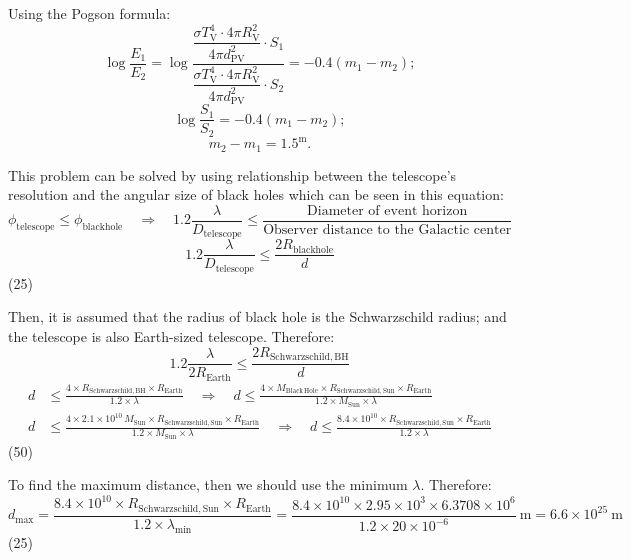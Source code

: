 Using the Pogson formula:
\[
\log\frac{E_1}{E_2}
 = \log\frac{\dfrac{\sigma T_{\mathrm{V}}^4 \cdot 4\pi R_{\mathrm{V}}^2}
                   {4\pi d_{\mathrm{PV}}^2} \cdot S_1}
            {\dfrac{\sigma T_{\mathrm{V}}^4 \cdot 4\pi R_{\mathrm{V}}^2}
                   {4\pi d_{\mathrm{PV}}^2} \cdot S_2}
 = -0.4(m_1 - m_2);
\]
\[
\log\frac{S_1}{S_2} = -0.4(m_1 - m_2);
\]
\[
m_2 - m_1 = 1.5^{\mathrm{m}}.
\]

This problem can be solved by using relationship between the telescope's
resolution and the angular size of black holes which can be seen in this
equation:
\[
\phi_{\mathrm{telescope}} \leq \phi_{\mathrm{blackhole}}
\quad\Rightarrow\quad
1.2\frac{\lambda}{D_{\mathrm{telescope}}}
 \leq \frac{\text{Diameter of event horizon}}
           {\text{Observer distance to the Galactic center}}
\]
\[
1.2\frac{\lambda}{D_{\mathrm{telescope}}}
 \leq \frac{2R_{\mathrm{blackhole}}}{d}
\]
\hfill(25)

Then, it is assumed that the radius of black hole is the Schwarzschild
radius; and the telescope is also Earth-sized telescope. Therefore:
\[
1.2\frac{\lambda}{2R_{\mathrm{Earth}}}
 \leq \frac{2R_{\mathrm{Schwarzschild,BH}}}{d}
\]
\begin{align*}
d &\leq \frac{4 \times R_{\mathrm{Schwarzschild,BH}} \times R_{\mathrm{Earth}}}
             {1.2 \times \lambda}
\quad\Rightarrow\quad
d \leq \frac{4 \times M_{\mathrm{Black\,Hole}}
             \times R_{\mathrm{Schwarzschild,Sun}} \times R_{\mathrm{Earth}}}
            {1.2 \times M_{\mathrm{Sun}} \times \lambda}\\
d &\leq \frac{4 \times 2.1 \times 10^{10}\,M_{\mathrm{Sun}}
             \times R_{\mathrm{Schwarzschild,Sun}} \times R_{\mathrm{Earth}}}
            {1.2 \times M_{\mathrm{Sun}} \times \lambda}
\quad\Rightarrow\quad
d \leq \frac{8.4 \times 10^{10}
             \times R_{\mathrm{Schwarzschild,Sun}} \times R_{\mathrm{Earth}}}
            {1.2 \times \lambda}
\end{align*}
\hfill(50)

To find the maximum distance, then we should use the minimum $\lambda$.
Therefore:
\[
d_{\max} = \frac{8.4 \times 10^{10}
            \times R_{\mathrm{Schwarzschild,Sun}} \times R_{\mathrm{Earth}}}
           {1.2 \times \lambda_{\min}}
 = \frac{8.4 \times 10^{10} \times 2.95 \times 10^{3}
         \times 6.3708 \times 10^{6}}
        {1.2 \times 20 \times 10^{-6}}\ \mathrm{m}
 = 6.6 \times 10^{25}\ \mathrm{m}
\]
\hfill(25)

